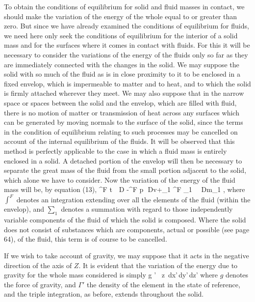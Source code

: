 \documentclass[12pt]{memoir}
\begin{document}
To obtain the conditions of equilibrium for solid and fluid masses in contact, we should make the variation of the energy of the whole equal to or greater than zero. But since we have already examined the conditions of equilibrium for fluids, we need here only seek the conditions of equilibrium for the interior of a solid mass and for the surfaces where it comes in contact with fluids. For this it will be necessary to consider the variations of the energy of the fluids only so far as they are immediately connected with the changes in the solid. We may suppose the solid with so much of the fluid as is in close proximity to it to be enclosed in a fixed envelop, which is impermeable to matter and to heat, and to which the solid is firmly attached wherever they meet. We may also suppose that in the narrow space or spaces between the solid and the envelop, which are filled with fluid, there is no motion of matter or transmission of heat across any surfaces which can be generated by moving normals to the surface of the solid, since the terms in the condition of equilibrium relating to such processes may be cancelled on account of the internal equilibrium of the fluids. It will be observed that this method is perfectly applicable to the case in which a fluid mass is entirely enclosed in a solid. A detached portion of the envelop will then be necessary to separate the great mass of the fluid from the small portion adjacent to the solid, which alone we have to consider. Now the variation of the energy of the fluid mass will be, by equation (13),
\eqs \int^F t \, \delta \,D \eta -\int^F p \,\delta \,Dv+\sum_1 \int^F \mu_1 \, \delta \, Dm_1 , \label{358}\eqe
where $\int^F$ denotes an integration extending over all the elements of the fluid (within the envelop), and $\sum_1$ denotes a summation with regard to those independently variable components of the fluid of which the solid is composed. Where the solid does not consist of substances which are components, actual or possible (see page 64), of the fluid, this term is of course to be cancelled.


If we wish to take account of gravity, we may suppose that it acts in the negative direction of the axis of $Z$. It is evident that the variation of the energy due to gravity for the whole mass considered is simply
\eqs \int \int \int g \Gamma' \, \delta z \,dx'\,dy'\,dz' \label{359}\eqe
where $g$ denotes the force of gravity, and $\Gamma'$ the density of the element in the state of reference, and the triple integration, as before, extends throughout the solid.
\end{document}
